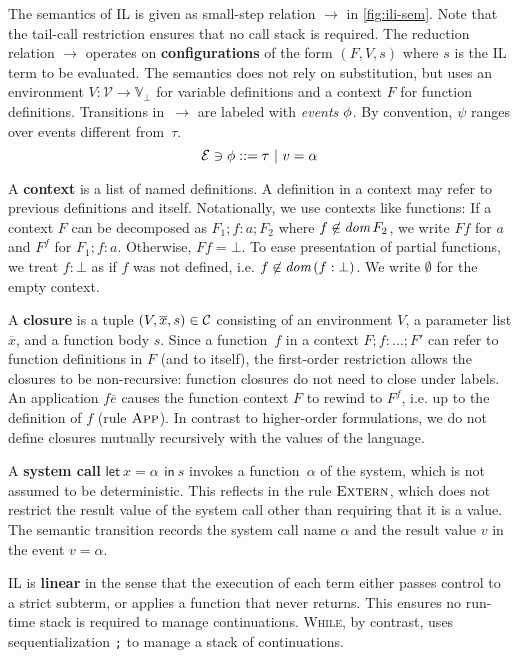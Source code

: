 \documentclass[openright,a4paper,11pt]{scrartcl}
\newcommand{\slist}[1]{\ensuremath{\overline{#1}}}
\newcommand{\dom}{\ensuremath{\textup{\textit{dom\,}}}}
\newcommand{\nrule}[1]{\ensuremath{\textup{\textsc{#1}}}}
\newcommand{\Var}{\ensuremath{\mathcal{V}}}
\newcommand{\Valb}{\ensuremath{\mathbb{V}_{\bot}}}
\newcommand{\Evt}{\ensuremath{\mathcal{E}}}
\newcommand{\ilIn}{\textsf{in}}
\newcommand{\ilEvent}[4]{\textsf{let}~#1=#2\,#3~\ilIn~#4}
\newcommand{\fevals}{\ensuremath{\longrightarrow}}
\newcommand{\ndef}[1]{\textbf{#1}}
\newcommand{\myref}[1]{\autoref{#1}}
\theoremstyle{plain}
\theoremstyle{plain}
\theoremstyle{plain}
\theoremstyle{plain}
\theoremstyle{nonumberplain}
\begin{document}
\label{sec:ilf}
The semantics of IL is given as small-step relation $\fevals$ in \myref{fig:ili-sem}.
Note that the tail-call restriction ensures that no call stack is required.
The reduction relation $\fevals$ operates on \ndef{configurations} of the form $(F,V,s)$ where $s$ is the IL term to be evaluated.
The semantics does not rely on substitution, but uses an environment $V:\Var\to\Valb$ for variable definitions and a context $F$ for function definitions.
Transitions in~$\fevals$ are labeled with \emph{events} $\phi$.
By convention, $\psi$ ranges over events different from~$\tau$.
 $$\Evt\ni\evt ::= \tau~|~v=\alpha$$

A \ndef{context} is a list of named definitions.
A definition in a context may refer to previous definitions and itself.
Notationally, we use contexts like functions:
If a context $F$ can be decomposed as $F_1;f:a;F_2$ where $f\not\in\dom{F_2}$, we write $F f$ for $a$ and $F^f$ for $F_1;f:a$. Otherwise, $F f=\bot$.
To ease presentation of partial functions, we treat $f:\bot$ as if $f$ was not defined, i.e. $f\not\in\dom{(f:\bot)}$.
We write $\emptyset$ for the empty context.

A \ndef{closure} is a tuple $(V,\slist{x},s)\in\closures$ consisting of an environment $V$, a parameter list $\slist{x}$, and a function body $s$.
Since a function~$f$ in a context $F;f:\ldots;F'$ can refer to function definitions in $F$ (and to itself), the first-order restriction allows the closures to be non-recursive: function closures do not need to close under labels.
An application $f \slist{e}$ causes the function context $F$ to rewind to $F^f$, i.e. up to the definition of $f$ (rule \nrule{App}).
In contrast to higher-order formulations, we do not define closures mutually recursively with the values of the language.


A \textbf{system call} $\ilEvent{x}{\alpha}{}{s}$ invokes a function~$\alpha$ of the system, which is not assumed to be deterministic.
This reflects in the rule \nrule{Extern}, which does not restrict the result value of the system call other than requiring that it is a value.
The semantic transition records the system call name $\alpha$ and the result value $v$ in the event $v=\alpha$.

IL is \textbf{linear} in the sense that the execution of each term either passes control to a strict subterm,
or applies a function that never returns.
This ensures no run-time stack is required to manage continuations.
\textsc{While}, by contrast, uses sequentialization \texttt{;} to manage a stack of continuations.
\end{document}
